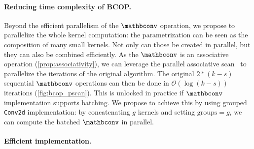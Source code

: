 \vspace{-1mm}\paragraph{Reducing time complexity of BCOP.}
    Beyond the efficient parallelism of the $\mathbconv$ operation, we propose to parallelize the whole kernel computation: the parametrization can be seen as the composition of many small kernels. Not only can those be created in parallel, but they can also be combined efficiently. As the $\mathbconv$ is an associative operation (\cref{prop:associativity}), we can leverage the parallel associative scan~\cite{zouzias2023parallel, daniel1986data} to parallelize the iterations of the original algorithm. The original $2*(k-s)$ sequential $\mathbconv$ operations can then be done in  $\mathcal{O} (\log (k-s)) $ iterations (\cref{fig:bcop_pscan}). This is unlocked in practice if $\mathbconv$ implementation supports batching. %
    We propose to achieve this by using grouped \texttt{Conv2d} implementation: by concatenating $g$ kernels and setting $\text{groups}=g$, we can compute the batched $\mathbconv$ in parallel.


\vspace{-1mm}\paragraph{Efficient implementation.}

